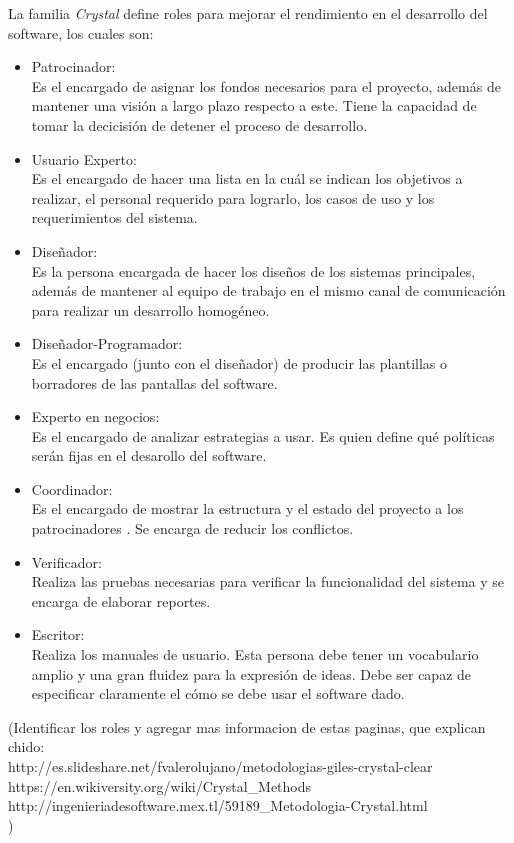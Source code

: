 \documentclass[12pt,a4paper]{article}
\begin{document}
	
	La familia {\itshape Crystal} define roles para mejorar el rendimiento en el desarrollo del software, los cuales son:
	\begin{itemize}
		\item Patrocinador:\\
		Es el encargado de asignar los fondos necesarios para el proyecto, adem\'as de mantener una visi\'on a largo plazo respecto a este. Tiene la capacidad de tomar la decicisi\'on de detener el proceso de desarrollo.
		\item Usuario Experto:\\
		Es el encargado de hacer una lista en la cu\'al se indican los objetivos a realizar, el personal requerido para lograrlo, los casos de uso y los requerimientos del sistema. 
		\item Dise\~nador:\\
		Es la persona encargada de hacer los dise\~nos de los sistemas principales, adem\'as de mantener al equipo de trabajo en el mismo canal de comunicaci\'on para realizar un desarrollo homog\'eneo.
		\item Dise\~nador-Programador:\\
		Es el encargado (junto con el dise\~nador) de producir las plantillas o borradores de las pantallas del software.
		\item Experto en negocios:\\
		Es el encargado de analizar estrategias a usar. Es quien define qu\'e pol\'iticas ser\'an fijas en el desarollo del software.
		\item Coordinador:\\
		Es el encargado de mostrar la estructura y el estado del proyecto a los patrocinadores . Se encarga de reducir los conflictos.
		\item Verificador:\\
		Realiza las pruebas necesarias para verificar la funcionalidad del sistema y se encarga de elaborar reportes.
		\item Escritor:\\
	Realiza los manuales de usuario. Esta persona debe tener un vocabulario amplio y una gran fluidez para la expresi\'on de ideas. Debe ser capaz de especificar claramente el c\'omo se debe usar el software dado.      
	\end{itemize}
	
	 
	
	(Identificar los roles y agregar mas informacion de estas paginas, que explican chido:\\
	http://es.slideshare.net/fvalerolujano/metodologias-giles-crystal-clear \\
	https://en.wikiversity.org/wiki/Crystal\_Methods \\
	http://ingenieriadesoftware.mex.tl/59189\_Metodologia-Crystal.html \\
	)\\
	
\end{document}
